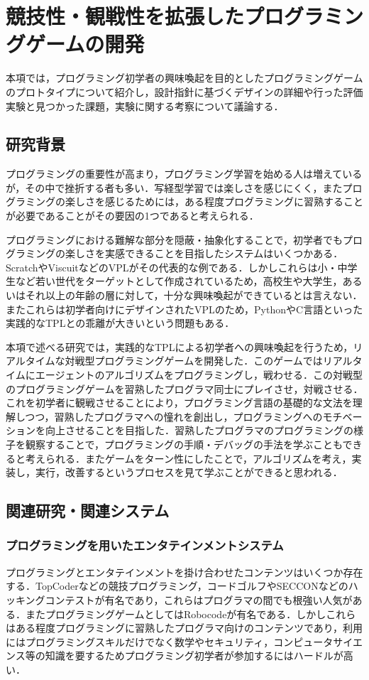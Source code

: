 \section{競技性・観戦性を拡張したプログラミングゲームの開発}
本項では，プログラミング初学者の興味喚起を目的としたプログラミングゲームのプロトタイプについて紹介し，設計指針に基づくデザインの詳細や行った評価実験と見つかった課題，実験に関する考察について議論する．

\subsection{研究背景}
プログラミングの重要性が高まり，プログラミング学習を始める人は増えているが，その中で挫折する者も多い．写経型学習では楽しさを感じにくく，またプログラミングの楽しさを感じるためには，ある程度プログラミングに習熟することが必要であることがその要因の1つであると考えられる．

プログラミングにおける難解な部分を隠蔽・抽象化することで，初学者でもプログラミングの楽しさを実感できることを目指したシステムはいくつかある．ScratchやViscuitなどのVPLがその代表的な例である．しかしこれらは小・中学生など若い世代をターゲットとして作成されているため，高校生や大学生，あるいはそれ以上の年齢の層に対して，十分な興味喚起ができているとは言えない．またこれらは初学者向けにデザインされたVPLのため，PythonやC言語といった実践的なTPLとの乖離が大きいという問題もある．

本項で述べる研究では，実践的なTPLによる初学者への興味喚起を行うため，リアルタイムな対戦型プログラミングゲームを開発した．このゲームではリアルタイムにエージェントのアルゴリズムをプログラミングし，戦わせる．この対戦型のプログラミングゲームを習熟したプログラマ同士にプレイさせ，対戦させる．これを初学者に観戦させることにより，プログラミング言語の基礎的な文法を理解しつつ，習熟したプログラマへの憧れを創出し，プログラミングへのモチベーションを向上させることを目指した．習熟したプログラマのプログラミングの様子を観察することで，プログラミングの手順・デバッグの手法を学ぶこともできると考えられる．またゲームをターン性にしたことで，アルゴリズムを考え，実装し，実行，改善するというプロセスを見て学ぶことができると思われる．


\subsection{関連研究・関連システム}

\subsubsection{プログラミングを用いたエンタテインメントシステム}
プログラミングとエンタテインメントを掛け合わせたコンテンツはいくつか存在する．TopCoder\cite{topcoder}などの競技プログラミング，コードゴルフ\cite{codegolf}やSECCON\cite{seccon}などのハッキングコンテストが有名であり，これらはプログラマの間でも根強い人気がある．またプログラミングゲームとしてはRobocode\cite{robocode}が有名である．しかしこれらはある程度プログラミングに習熟したプログラマ向けのコンテンツであり，利用にはプログラミングスキルだけでなく数学やセキュリティ，コンピュータサイエンス等の知識を要するためプログラミング初学者が参加するにはハードルが高い．

